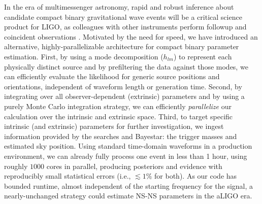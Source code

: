 \documentclass[twocolumn,prd,nofootinbib]{revtex4}
\newcommand\BS{{\sc Bayestar}}
\begin{document}
In the era of multimessenger astronomy, rapid and robust inference about candidate compact binary gravitational wave
events will be a critical science product for LIGO, as  colleagues with other instruments  perform followup and
coincident observations \cite{LIGO-2013-WhitePaper-CoordinatedEMObserving}.  
Motivated by the need for speed, we have introduced an alternative, highly-parallelizable architecture for compact
binary parameter estimation.   
%   
First, by using a mode decomposition  ($h_{lm}$) to represent each physically distinct source and by
prefiltering the data against those modes, we can efficiently evaluate the likelihood for generic source positions and
orientations, independent of waveform length or generation time.   
% 
Second, by integrating over all observer-dependent (extrinsic) parameters and by using a purely Monte Carlo
integration strategy, we can efficiently \emph{parallelize} our calculation over the intrinsic and extrinsic space.  
%
Third, to target specific intrinsic (and extrinsic) parameters for further investigation, we ingest information provided
by the searches and \BS{}: the trigger masses and estimated sky position.  
Using standard time-domain waveforms in a production environment, we can already fully process one event in less than 1 hour, using roughly $1000$ cores in parallel,
producing posteriors and evidence with reproducibly small statistical errors (i.e., $\lesssim 1\%$ for both).  
%
As our code has bounded runtime, almost independent of the starting frequency for the signal, a nearly-unchanged strategy could
 estimate NS-NS parameters in the aLIGO era.  

\end{document}
